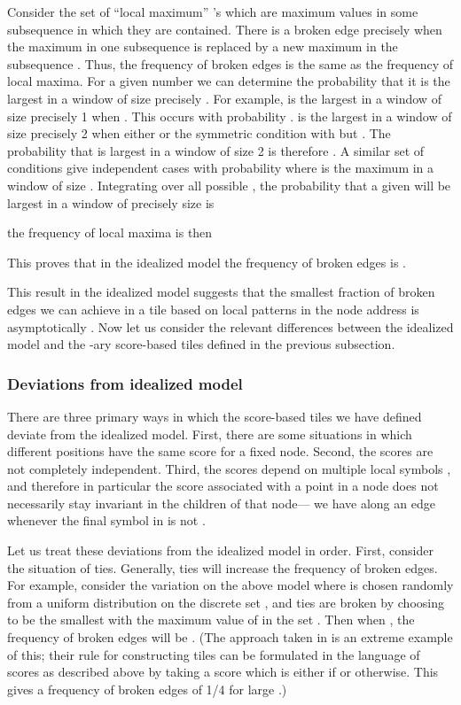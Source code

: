 \documentclass[12pt]{article}
\begin{document}
Consider the set of ``local maximum'' 's which are maximum values
in some subsequence  in which they are contained.  There is a
broken edge precisely when the maximum  in one subsequence  is
replaced by a new maximum  in the subsequence .  Thus,
the frequency of broken edges is the same as the frequency of local
maxima.  For a given number  we can determine the probability that
it is the largest  in a window of size precisely .  For
example,  is the largest in a window of size precisely 1
when .  This occurs with probability
.   is the largest in a window of size precisely 2 when either
 or the symmetric condition
with  but .  The probability
that  is largest in a window of size 2 is therefore .
A similar set of conditions give  independent cases with
probability  where  is the maximum in a window of
size .  Integrating over all possible , the probability that a
given  will be largest in a window of precisely size  is

the frequency of local maxima is then 

This proves that in the idealized model the frequency of broken edges
is .

\vspace*{0.1in}

This result in the idealized model suggests that the smallest fraction
of broken edges we can achieve in a tile based on local patterns in
the node address is asymptotically
.  
Now let us consider the relevant differences between the idealized
model and the -ary score-based tiles defined in the previous
subsection.

\subsubsection{Deviations from idealized model}

There are  three primary ways in which the score-based tiles we have
defined deviate from the idealized model.  First, there are some
situations in which different positions have the same score  for a fixed node.  Second, the scores are not completely
independent.  Third, the scores  depend on multiple local
symbols , and therefore in particular the score associated with a
point  in a node does not necessarily stay invariant in the
children of that node--- we  have  along an edge  whenever the final symbol in 
is not .

Let us treat these deviations from the idealized model in order.
First, consider the situation of ties.  Generally, ties will increase
the frequency of broken edges.  For example, consider the variation on
the above model where  is chosen randomly from a uniform
distribution on the discrete set , and ties
are broken by choosing  to be the smallest  with the maximum
value of  in the set .  Then when , the
frequency of broken edges will be .  (The approach taken
in \cite{Viterbi} is an extreme example of this; their rule for
constructing tiles can be formulated in the language of scores as
described above by taking a score which is either  if  or  otherwise.  This gives a frequency of
broken edges of 1/4 for large .)
\end{document}
